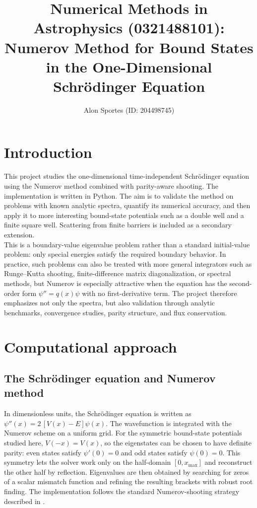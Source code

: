 \documentclass[11pt]{article}
\title{\textbf{Numerical Methods in Astrophysics (0321488101): Numerov Method for Bound States in the One-Dimensional Schr\"odinger Equation}}
\author{Alon Sportes (ID: 204498745)}
\date{}
\begin{document}
    \maketitle

    \begin{refsection}

    \section{Introduction}
        This project studies the one-dimensional time-independent Schr\"odinger equation using the Numerov method combined with parity-aware shooting. The implementation is written in Python. The aim is to validate the method on problems with known analytic spectra, quantify its numerical accuracy, and then apply it to more interesting bound-state potentials such as a double well and a finite square well. Scattering from finite barriers is included as a secondary extension. \\

        This is a boundary-value eigenvalue problem rather than a standard initial-value problem: only special energies satisfy the required boundary behavior. In practice, such problems can also be treated with more general integrators such as Runge--Kutta shooting, finite-difference matrix diagonalization, or spectral methods, but Numerov is especially attractive when the equation has the second-order form $\psi''=q(x)\psi$ with no first-derivative term. The project therefore emphasizes not only the spectra, but also validation through analytic benchmarks, convergence studies, parity structure, and flux conservation.
        
    \section{Computational approach}
        \subsection{The Schr\"odinger equation and Numerov method}
            In dimensionless units, the Schr\"odinger equation is written as $\psi''(x) = 2\,[V(x)-E]\psi(x)$. The wavefunction is integrated with the Numerov scheme on a uniform grid. For the symmetric bound-state potentials studied here, $V(-x)=V(x)$, so the eigenstates can be chosen to have definite parity: even states satisfy $\psi'(0)=0$ and odd states satisfy $\psi(0)=0$. This symmetry lets the solver work only on the half-domain $[0,x_{\max}]$ and reconstruct the other half by reflection. Eigenvalues are then obtained by searching for zeros of a scalar mismatch function and refining the resulting brackets with robust root finding. The implementation follows the standard Numerov-shooting strategy described in \cite{Pang_2006}.


\end{refsection}
\end{document}
